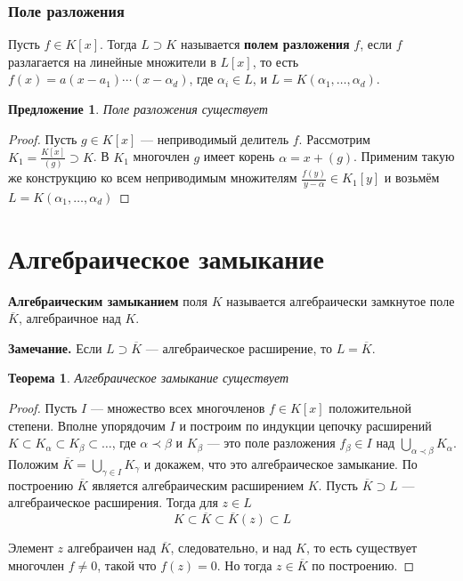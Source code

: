 \documentclass[a4paper]{article}
\newtheorem{theorem}{Теорема}
\numberwithin{theorem}{section}
\numberwithin{lemma}{section}
\newtheorem{proposition}{Предложение}
\numberwithin{proposition}{section}
\numberwithin{corollary}{section}
\begin{document}
\subsubsection*{Поле разложения}

Пусть $f \in K[x]$. Тогда $L \supset K$ называется \textbf{полем разложения} $f$, если $f$ разлагается на линейные множители в $L[x]$,
то есть $f(x) = a(x - a_1) \cdots (x - \alpha_d)$,
где $\alpha_i \in L$, и $L = K(\alpha_1, \ldots, \alpha_d)$.

\begin{proposition}
Поле разложения существует
\end{proposition}
\begin{proof}
Пусть $g \in K[x]$ --- неприводимый делитель $f$.
Рассмотрим $K_1 = \frac{K[x]}{(g)} \supset K$. В $K_1$ многочлен $g$
имеет корень $\alpha = x + (g)$. Применим такую же конструкцию
ко всем неприводимым множителям $\frac{f(y)}{y - \alpha} \in K_1[y]$
и возьмём $L = K(\alpha_1, \ldots, \alpha_d)$
\end{proof}

\section{Алгебраическое замыкание}
\textbf{Алгебраическим замыканием} поля $K$ называется алгебраически замкнутое поле $\overline{K}$, алгебраичное над $K$.

\textbf{Замечание.} Если $L \supset \overline{K}$ --- алгебраическое расширение, то $L = \overline{K}$.

\begin{theorem}
Алгебраическое замыкание существует
\end{theorem}
\begin{proof}
Пусть $I$ --- множество всех многочленов $f \in K[x]$ положительной степени. Вполне упорядочим $I$ и построим по индукции цепочку
расширений $K \subset K_\alpha \subset K_\beta \subset \ldots$,
где $\alpha \prec \beta$ и $K_\beta$ --- это поле разложения
$f_\beta \in I$ над $\bigcup_{\alpha\prec\beta}K_\alpha$.
Положим $\overline{K} = \bigcup_{\gamma \in I} K_\gamma$ и докажем,
что это алгебраическое замыкание. По построению $\overline{K}$ является алгебраическим расширением $K$.
Пусть $\overline{K} \supset L$ --- алгебраическое расширения.
Тогда для $z \in L$
\[K \subset \overline{K} \subset\overline{K}(z) \subset L\]

Элемент $z$ алгебраичен над $\overline{K}$, следовательно, и над $K$,
то есть существует многочлен $f \ne 0$, такой что $f(z) = 0$.
Но тогда $z \in \overline{K}$ по построению.
\end{proof}
\end{document}
